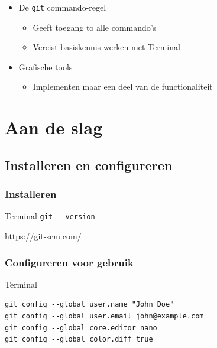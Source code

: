 \documentclass[]{beamer}
\begin{document}
\begin{frame}
    \begin{itemize}
        \item De \texttt{git} commando-regel
        \begin{itemize}
            \item Geeft toegang to alle commando's
            \item Vereist basiskennis werken met Terminal
        \end{itemize}
        \pause
        \item Grafische tools
        \begin{itemize}
            \item Implementen maar een deel van de functionaliteit
        \end{itemize}
    \end{itemize}
\end{frame}

\section{Aan de slag}

\subsection{Installeren en configureren}

\begin{frame}[fragile]
    \frametitle{Installeren}

    \centering

    \begin{block}{Terminal}
    \verb/git --version/
    \end{block}

    \vspace{10 mm}
    \pause

    \url{https://git-scm.com/}
\end{frame}

\begin{frame}[fragile]
    \frametitle{Configureren voor gebruik}

    \begin{block}{Terminal}
\begin{verbatim}
git config --global user.name "John Doe"
git config --global user.email john@example.com
git config --global core.editor nano
git config --global color.diff true
\end{verbatim}
    \end{block}
\end{frame}
\end{document}
